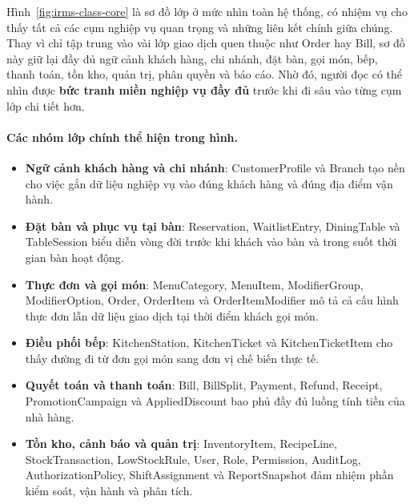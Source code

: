 \documentclass[11pt,a4paper]{article}
\begin{document}
Hình~\ref{fig:irms-class-core} là sơ đồ lớp ở mức nhìn toàn hệ thống, có nhiệm vụ cho thấy tất cả các cụm nghiệp vụ quan trọng và những liên kết chính giữa chúng. Thay vì chỉ tập trung vào vài lớp giao dịch quen thuộc như \textsf{Order} hay \textsf{Bill}, sơ đồ này giữ lại đầy đủ ngữ cảnh khách hàng, chi nhánh, đặt bàn, gọi món, bếp, thanh toán, tồn kho, quản trị, phân quyền và báo cáo. Nhờ đó, người đọc có thể nhìn được \textbf{bức tranh miền nghiệp vụ đầy đủ} trước khi đi sâu vào từng cụm lớp chi tiết hơn.

\paragraph{Các nhóm lớp chính thể hiện trong hình.}
\begin{itemize}
  \item \textbf{Ngữ cảnh khách hàng và chi nhánh}: \textsf{CustomerProfile} và \textsf{Branch} tạo nền cho việc gắn dữ liệu nghiệp vụ vào đúng khách hàng và đúng địa điểm vận hành.
  \item \textbf{Đặt bàn và phục vụ tại bàn}: \textsf{Reservation}, \textsf{WaitlistEntry}, \textsf{DiningTable} và \textsf{TableSession} biểu diễn vòng đời trước khi khách vào bàn và trong suốt thời gian bàn hoạt động.
  \item \textbf{Thực đơn và gọi món}: \textsf{MenuCategory}, \textsf{MenuItem}, \textsf{ModifierGroup}, \textsf{ModifierOption}, \textsf{Order}, \textsf{OrderItem} và \textsf{OrderItemModifier} mô tả cả cấu hình thực đơn lẫn dữ liệu giao dịch tại thời điểm khách gọi món.
  \item \textbf{Điều phối bếp}: \textsf{KitchenStation}, \textsf{KitchenTicket} và \textsf{KitchenTicketItem} cho thấy đường đi từ đơn gọi món sang đơn vị chế biến thực tế.
  \item \textbf{Quyết toán và thanh toán}: \textsf{Bill}, \textsf{BillSplit}, \textsf{Payment}, \textsf{Refund}, \textsf{Receipt}, \textsf{PromotionCampaign} và \textsf{AppliedDiscount} bao phủ đầy đủ luồng tính tiền của nhà hàng.
  \item \textbf{Tồn kho, cảnh báo và quản trị}: \textsf{InventoryItem}, \textsf{RecipeLine}, \textsf{StockTransaction}, \textsf{LowStockRule}, \textsf{User}, \textsf{Role}, \textsf{Permission}, \textsf{AuditLog}, \textsf{AuthorizationPolicy}, \textsf{ShiftAssignment} và \textsf{ReportSnapshot} đảm nhiệm phần kiểm soát, vận hành và phân tích.
\end{itemize}
\end{document}
